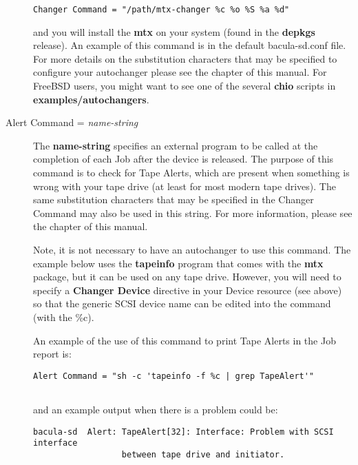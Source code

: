 \begin{description}
\footnotesize
\begin{verbatim}
Changer Command = "/path/mtx-changer %c %o %S %a %d"
\end{verbatim}
\normalsize

   and you will install the {\bf mtx} on your system (found  in the {\bf depkgs}
   release). An example of this command is in the default bacula-sd.conf file. 
   For more details on the substitution characters that may be specified  to
   configure your autochanger please see  the 
    chapter of this  manual.
   For FreeBSD users, you might want to see one of the  several {\bf chio}
   scripts in {\bf examples/autochangers}.  

\item [Alert Command = {\it name-string}]
   The {\bf name-string} specifies an external program to be called at the
   completion of each Job after the device is released.  The purpose of this
   command is to check for Tape Alerts, which are present when something is
   wrong with your tape drive (at least for most modern tape drives).  The same
   substitution characters that may be specified in the Changer Command may
   also be used in this string.  For more information, please see the
    chapter of this manual.
   
   
   Note, it is not necessary to have an autochanger to use this command. The
   example below uses the {\bf tapeinfo} program that comes with the {\bf mtx}
   package, but it can be used on any tape drive. However, you will need to
   specify a {\bf Changer Device} directive in your Device resource (see above)
   so that the generic SCSI device name can be edited into the command (with
   the \%c).
   
   An example of the use of this command to print Tape Alerts  in the Job report
   is:  

\footnotesize
\begin{verbatim}
Alert Command = "sh -c 'tapeinfo -f %c | grep TapeAlert'"
      
\end{verbatim}
\normalsize

and an example output when there is a problem could be:  

\footnotesize
\begin{verbatim}
bacula-sd  Alert: TapeAlert[32]: Interface: Problem with SCSI interface
                  between tape drive and initiator.
      

\end{verbatim}
\end{description}
